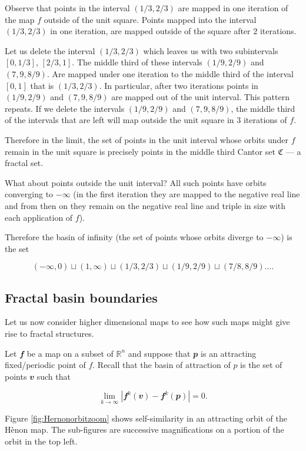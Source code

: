 \documentclass[
  a4paper,
  oneside,
  final]{krantz}
\newcommand{\R}{\mathbb{R}}
\renewcommand{\v}[1]{{\mathbfit{#1}}}
\newcommand{\CC}{\mathfrak{C}}
\theoremstyle{definition}
\theoremstyle{definition}
\theoremstyle{definition}
\theoremstyle{definition}
\theoremstyle{remark}
\begin{document}
Observe that points in the interval \((1/3, 2/3)\) are mapped in one iteration of the map \(f\) outside of the unit square. Points mapped into the interval \((1/3, 2/3)\) in one iteration, are mapped outside of the square after \(2\) iterations.

Let us delete the interval \((1/3, 2/3)\) which leaves us with two subintervals \([0, 1/3]\), \([2/3,1]\). The middle third of these intervals \((1/9, 2/9)\) and \((7,9, 8/9)\). Are mapped under one iteration to the middle third of the interval \([0,1]\) that is \((1/3, 2/3)\). In particular, after two iterations points in \((1/9, 2/9)\) and \((7,9, 8/9)\) are mapped out of the unit interval. This pattern repeats. If we delete the intervals \((1/9, 2/9)\) and \((7,9, 8/9)\), the middle third of the intervals that are left will map outside the unit square in \(3\) iterations of \(f\).

Therefore in the limit, the set of points in the unit interval whose orbits under \(f\) remain in the unit square is precisely points in the middle third Cantor set \(\CC\) --- a fractal set.

What about points outside the unit interval? All such points have orbits converging to \(-\infty\) (in the first iteration they are mapped to the negative real line and from then on they remain on the negative real line and triple in size with each application of \(f\)).

Therefore the basin of infinity (the set of points whose orbits diverge to \(- \infty\)) is the set

\[ (-\infty,0) \sqcup (1, \infty) \sqcup (1/3, 2/3) \sqcup (1/9, 2/9) \sqcup (7/8, 8/9) \ldots .\]

\hypertarget{Fractal-basin-boundaries}{%
\subsection{Fractal basin boundaries}\label{Fractal-basin-boundaries}}

Let us now consider higher dimensional maps to see how such maps might give rise to fractal structures.

Let \(\v{f}\) be a map on a subset of \(\R^{n}\) and suppose that \(\v{p}\) is an attracting fixed/periodic point of \(f\). Recall that the basin of attraction of \(p\) is the set of points \(\v{v}\) such that

\[\lim_{k \to \infty} | \v{f}^{k}(\v{v}) - \v{f}^{k}(\v{p})| = 0.\]

Figure \ref{fig:Hernonorbitzoom} shows self-similarity in an attracting orbit of the Hènon map. The sub-figures are successive magnifications on a portion of the orbit in the top left.
\end{document}
